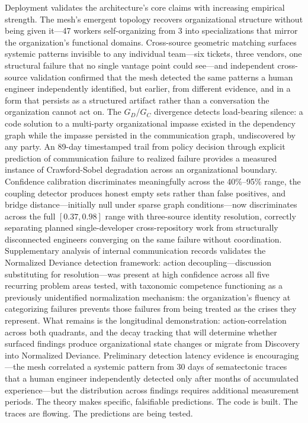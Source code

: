 \documentclass[11pt,a4paper]{article}
\begin{document}
Deployment validates the architecture's core claims with increasing empirical strength. The mesh's emergent topology recovers organizational structure without being given it---47 workers self-organizing from 3 into specializations that mirror the organization's functional domains. Cross-source geometric matching surfaces systemic patterns invisible to any individual team---six tickets, three vendors, one structural failure that no single vantage point could see---and independent cross-source validation confirmed that the mesh detected the same patterns a human engineer independently identified, but earlier, from different evidence, and in a form that persists as a structured artifact rather than a conversation the organization cannot act on. The $G_D$/$G_C$ divergence detects load-bearing silence: a code solution to a multi-party organizational impasse existed in the dependency graph while the impasse persisted in the communication graph, undiscovered by any party. An 89-day timestamped trail from policy decision through explicit prediction of communication failure to realized failure provides a measured instance of Crawford-Sobel degradation across an organizational boundary. Confidence calibration discriminates meaningfully across the 40\%--95\% range, the coupling detector produces honest empty sets rather than false positives, and bridge distance---initially null under sparse graph conditions---now discriminates across the full $[0.37, 0.98]$ range with three-source identity resolution, correctly separating planned single-developer cross-repository work from structurally disconnected engineers converging on the same failure without coordination. Supplementary analysis of internal communication records validates the Normalized Deviance detection framework: action decoupling---discussion substituting for resolution---was present at high confidence across all five recurring problem areas tested, with taxonomic competence functioning as a previously unidentified normalization mechanism: the organization's fluency at categorizing failures prevents those failures from being treated as the crises they represent. What remains is the longitudinal demonstration: action-correlation across both quadrants, and the decay tracking that will determine whether surfaced findings produce organizational state changes or migrate from Discovery into Normalized Deviance. Preliminary detection latency evidence is encouraging---the mesh correlated a systemic pattern from 30 days of sematectonic traces that a human engineer independently detected only after months of accumulated experience---but the distribution across findings requires additional measurement periods. The theory makes specific, falsifiable predictions. The code is built. The traces are flowing. The predictions are being tested.
\end{document}
